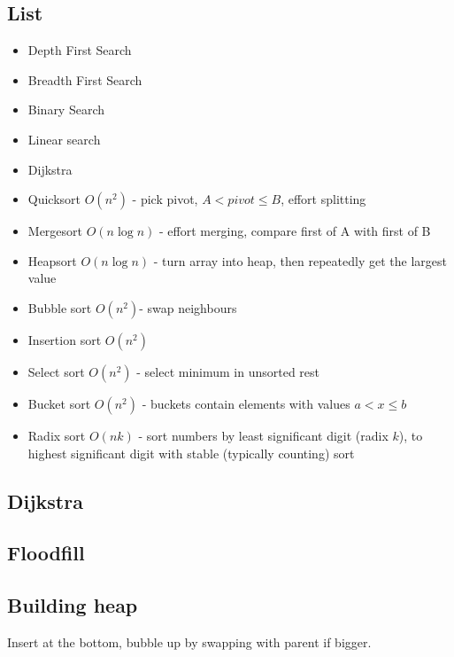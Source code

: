 \documentclass[10pt]{article}
\begin{document}
\subsection{List}
\begin{itemize}
\item Depth First Search
\item Breadth First Search
\item Binary Search
\item Linear search
\item Dijkstra
\item Quicksort $O(n^2)$ - pick pivot, $A<pivot \leq B$, effort splitting
\item Mergesort $O(n \log n)$ - effort merging, compare first of A with first of B
\item Heapsort $O(n \log n)$ - turn array into heap, then repeatedly get the largest value
\item Bubble sort $O(n^2)$- swap neighbours
\item Insertion sort $O(n^2)$
\item Select sort $O(n^2)$ - select minimum in unsorted rest
\item Bucket sort $O(n^2)$ - buckets contain elements with values $a < x \leq b$
\item Radix sort $O(nk)$ - sort numbers by least significant digit (radix $k$), to highest significant digit with stable (typically counting) sort
\end{itemize}

\subsection{Dijkstra}


\subsection{Floodfill}


\subsection{Building heap}
Insert at the bottom, bubble up by swapping with parent if bigger.
\end{document}
